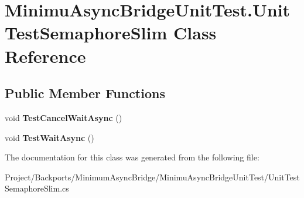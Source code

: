 \hypertarget{class_minimu_async_bridge_unit_test_1_1_unit_test_semaphore_slim}{}\section{Minimu\+Async\+Bridge\+Unit\+Test.\+Unit\+Test\+Semaphore\+Slim Class Reference}
\label{class_minimu_async_bridge_unit_test_1_1_unit_test_semaphore_slim}
\subsection*{Public Member Functions}
\begin{DoxyCompactItemize}
\item 
\mbox{\label{class_minimu_async_bridge_unit_test_1_1_unit_test_semaphore_slim_a1b598aed47dfae6839145ea34d231131}} 
void {\bfseries Test\+Cancel\+Wait\+Async} ()
\item 
\mbox{\label{class_minimu_async_bridge_unit_test_1_1_unit_test_semaphore_slim_a4619e0dce995d83279ad8f057740af95}} 
void {\bfseries Test\+Wait\+Async} ()
\end{DoxyCompactItemize}


The documentation for this class was generated from the following file\+:\begin{DoxyCompactItemize}
\item 
Project/\+Backports/\+Minimum\+Async\+Bridge/\+Minimu\+Async\+Bridge\+Unit\+Test/Unit\+Test\+Semaphore\+Slim.\+cs\end{DoxyCompactItemize}
